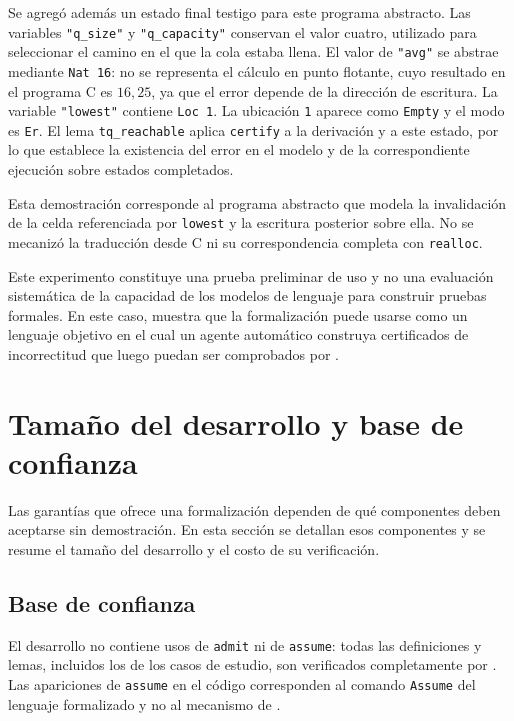 \documentclass[a4paper,	11pt]{report}
\begin{document}
Se agregó además un estado final testigo para este programa abstracto.
Las variables \lstinline|"q_size"| y \lstinline|"q_capacity"| conservan el valor cuatro,
utilizado para seleccionar el camino en el que la cola estaba llena.
El valor de \lstinline|"avg"| se abstrae mediante \lstinline|Nat 16|:
no se representa el cálculo en punto flotante,
cuyo resultado en el programa C es $16,25$,
ya que el error depende de la dirección de escritura.
La variable \lstinline|"lowest"| contiene \lstinline|Loc 1|.
La ubicación \lstinline|1| aparece como \lstinline|Empty| y el modo es \lstinline|Er|.
El lema \lstinline|tq_reachable| aplica \lstinline|certify| a la derivación y a este estado,
por lo que establece la existencia del error en el modelo y de la correspondiente ejecución sobre estados completados.

Esta demostración corresponde al programa abstracto que modela la invalidación de la celda referenciada por \lstinline|lowest|
y la escritura posterior sobre ella.
No se mecanizó la traducción desde C ni su correspondencia completa con \lstinline|realloc|.

Este experimento constituye una prueba preliminar de uso y no una evaluación sistemática de la capacidad de los modelos de lenguaje para construir pruebas formales.
En este caso,
muestra que la formalización puede usarse como un lenguaje objetivo en el cual un agente automático
construya certificados de incorrectitud que luego puedan ser comprobados por \fstar{}.

\section{Tamaño del desarrollo y base de confianza}
Las garantías que ofrece una formalización dependen de qué componentes deben aceptarse sin demostración.
En esta sección se detallan esos componentes y se resume el tamaño del desarrollo y el costo de su verificación.

\subsection*{Base de confianza}
El desarrollo no contiene usos de \lstinline|admit| ni de \lstinline|assume|:
todas las definiciones y lemas,
incluidos los de los casos de estudio,
son verificados completamente por \fstar{}.
Las apariciones de \lstinline|assume| en el código corresponden al comando \lstinline|Assume| del lenguaje formalizado y no al mecanismo de \fstar{}.
\end{document}
